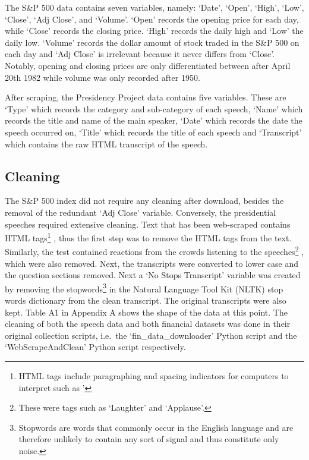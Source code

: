 \documentclass[11pt,preprint, authoryear]{elsarticle}
\numberwithin{equation}{section}
\numberwithin{figure}{section}
\numberwithin{table}{section}
\let\rmarkdownfootnote\footnote%
\def\footnote{\protect\rmarkdownfootnote}
\begin{document}
The S\&P 500 data contains seven variables, namely: `Date', `Open',
`High', `Low', `Close', `Adj Close', and `Volume'. `Open' records the
opening price for each day, while `Close' records the closing price.
`High' records the daily high and `Low' the daily low. `Volume' records
the dollar amount of stock traded in the S\&P 500 on each day and `Adj
Close' is irrelevant because it never differs from `Close'. Notably,
opening and closing prices are only differentiated between after April
20th 1982 while volume was only recorded after 1950.

After scraping, the Presidency Project data contains five variables.
These are `Type' which records the category and sub-category of each
speech, `Name' which records the title and name of the main speaker,
`Date' which records the date the speech occurred on, `Title' which
records the title of each speech and `Transcript' which contains the raw
HTML transcript of the speech.

\hypertarget{cleaning}{%
\subsection{Cleaning}\label{cleaning}}

The S\&P 500 index did not require any cleaning after download, besides
the removal of the redundant `Adj Close' variable. Conversely, the
presidential speeches required extensive cleaning. Text that has been
web-scraped contains HTML tags\footnote{HTML tags include paragraphing
  and spacing indicators for computers to interpret such as '} , thus
the first step was to remove the HTML tags from the text. Similarly, the
test contained reactions from the crowds listening to the
speeches\footnote{These were tags such as `Laughter' and `Applause'.} ,
which were also removed. Next, the transcripts were converted to lower
case and the question sections removed. Next a `No Stops Transcript'
variable was created by removing the stopwords\footnote{Stopwords are
  words that commonly occur in the English language and are therefore
  unlikely to contain any sort of signal and thus constitute only noise.}
in the Natural Language Tool Kit (NLTK) stop words dictionary from the
clean transcript. The original transcripts were also kept. Table A1 in
Appendix A shows the shape of the data at this point. The cleaning of
both the speech data and both financial datasets was done in their
original collection scripts, i.e.~the `fin\_data\_downloader' Python
script and the `WebScrapeAndClean' Python script respectively.
\end{document}
